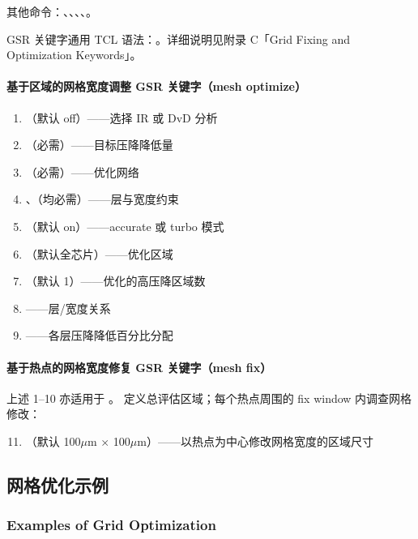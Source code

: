 其他命令：、、、、。

GSR 关键字通用 TCL 语法：。详细说明见附录 C「Grid Fixing and Optimization Keywords」。

\paragraph{基于区域的网格宽度调整 GSR 关键字（mesh optimize）}
\begin{enumerate}
  \item {}（默认 off）——选择 IR 或 DvD 分析
  \item {}（必需）——目标压降降低量
  \item {}（必需）——优化网络
  \item {}、（均必需）——层与宽度约束
  \item {}（默认 on）——accurate 或 turbo 模式
  \item {}（默认全芯片）——优化区域
  \item {}（默认 1）——优化的高压降区域数
  \item {}——层/宽度关系
  \item {}——各层压降降低百分比分配
\end{enumerate}

\paragraph{基于热点的网格宽度修复 GSR 关键字（mesh fix）}
上述 1--10 亦适用于 。 定义总评估区域；每个热点周围的 fix window 内调查网格修改：
\begin{enumerate}
  \setcounter{enumi}{10}
  \item {}（默认 100$\mu$m $\times$ 100$\mu$m）——以热点为中心修改网格宽度的区域尺寸
\end{enumerate}

\subsection{网格优化示例}
\subsubsection*{Examples of Grid Optimization}


